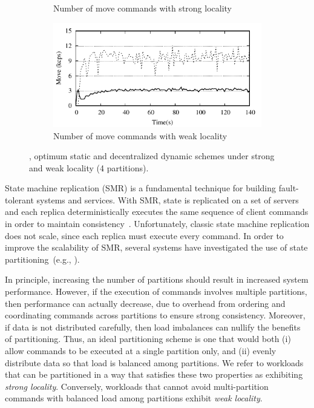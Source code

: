 \begin{figure}[ht!]
\begin{subfigure}[b]{0.45\textwidth}
  \caption{Number of move commands with strong locality}
  \end{subfigure}
  \begin{subfigure}[b]{0.45\textwidth}
    \centering
    \includegraphics[width=0.95\columnwidth]{figures/experiments/dynastar-vs-dssmr-4p-5-move}
    \caption{Number of move commands with weak locality}
  \end{subfigure}
  \caption{\dynastar, optimum static and decentralized dynamic schemes under strong and weak locality (4 partitions).}
  \label{fig:motivation}
\end{figure}




State machine replication (SMR) is a fundamental technique for
building fault-tolerant systems and services. With SMR, state is
replicated on a set of servers and each replica deterministically
executes the same sequence of client commands in order to maintain
consistency~\cite{Lam78,Sch90}. Unfortunately, classic state machine replication does not
scale, since each replica must execute every command. In order to
improve the scalability of SMR, several systems have investigated the
use of state partitioning~(e.g., \cite{corbett2013spanner, bezerra2014ssmr,Glendenning:2011kj,
  Aguilera:2007,bli16edcc}).

In principle, increasing the number of partitions should result in
increased system performance. However, if the execution of commands involves
multiple partitions, then performance can
actually decrease, due to overhead from ordering and coordinating
commands across partitions to ensure strong consistency. Moreover, if
data is not distributed carefully, then load imbalances can nullify
the benefits of partitioning. Thus, an ideal partitioning scheme is
one that would both (i) allow commands to be executed at a single
partition only, and (ii) evenly distribute data so that load is
balanced among partitions.  We refer to workloads that can be
partitioned in a way that satisfies these two properties as exhibiting
\emph{strong locality}.
Conversely, workloads that cannot avoid multi-partition commands with balanced load among partitions exhibit \emph{weak locality}.

